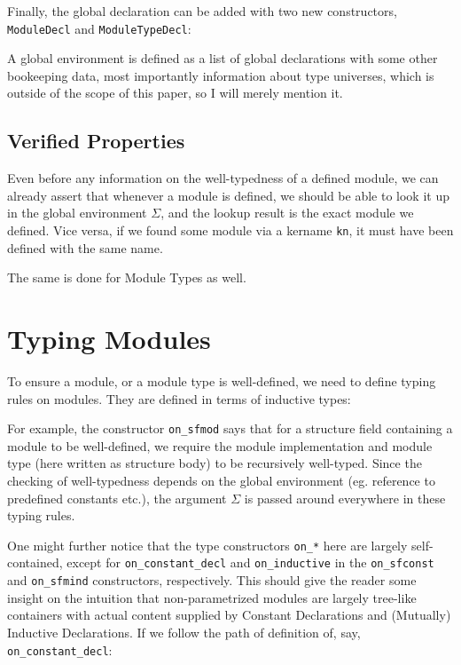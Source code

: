 Finally, the global declaration can be added with two new constructors,
\verb|ModuleDecl| and \verb|ModuleTypeDecl|:

A global environment is defined as a list of global declarations with some other
bookeeping data, most importantly information about type universes, which is
outside of the scope of this paper, so I will merely mention it.


\subsection*{Verified Properties}

Even before any information on the well-typedness of a defined module, we can
already assert that whenever a module is defined, we should be able to look it
up in the global environment $\Sigma$, and the lookup result is the exact module
we defined. Vice versa, if we found some module via a kername \verb|kn|, it must
have been defined with the same name.


The same is done for Module Types as well.

\section{Typing Modules}
To ensure a module, or a module type is well-defined, we need to define typing
rules on modules. They are defined in terms of inductive types:


For example, the constructor \verb|on_sfmod| says that for a structure field
containing a module to be well-defined, we require the module implementation and
module type (here written as structure body) to be recursively well-typed. Since
the checking of well-typedness depends on the global environment (eg. reference
to predefined constants etc.), the argument $\Sigma$ is passed around everywhere
in these typing rules.

One might further notice that the type constructors \verb|on_*| here are largely
self-contained, except for \verb|on_constant_decl| and \verb|on_inductive| in
the \verb|on_sfconst| and \verb|on_sfmind| constructors, respectively. This
should give the reader some insight on the intuition that non-parametrized
modules are largely tree-like containers with actual content supplied by
Constant Declarations and (Mutually) Inductive Declarations. If we follow the
path of definition of, say, \verb|on_constant_decl|:

